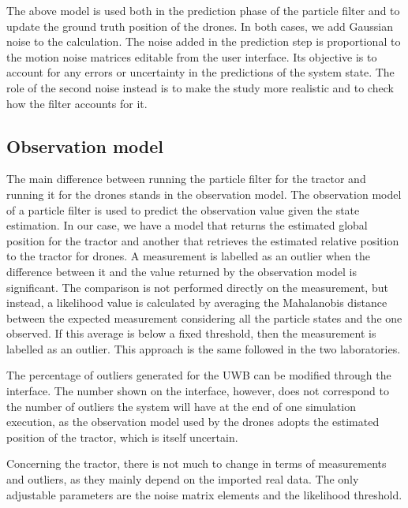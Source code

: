 \documentclass[letterpaper,twocolumn,10pt]{article}
\begin{document}
The above model is used both in the prediction phase of the particle filter and to update the ground truth position of the drones. In both cases, we add Gaussian noise to the calculation.
The noise added in the prediction step is proportional to the motion noise matrices editable from the user interface. Its objective is to account for any errors or uncertainty in the predictions of the system state.  
The role of the second noise instead is to make the study more realistic and to check how the filter accounts for it.

\subsection*{Observation model}
The main difference between running the particle filter for the tractor and running it for the drones stands in the observation model.
The observation model of a particle filter is used to predict the observation value given the state estimation. In our case,  we have a model that returns the estimated global position for the tractor and another that retrieves the estimated relative position to the tractor for drones. A measurement is labelled as an outlier when the difference between it and the value returned by the observation model is significant. The comparison is not performed directly on the measurement, but instead, a likelihood value is calculated by averaging the Mahalanobis distance between the expected measurement considering all the particle states and the one observed. If this average is below a fixed threshold, then the measurement is labelled as an outlier. This approach is the same followed in the two laboratories.

The percentage of outliers generated for the UWB can be modified through the interface. The number shown on the interface, however, does not correspond to the number of outliers the system will have at the end of one simulation execution, as the observation model used by the drones adopts the estimated position of the tractor, which is itself uncertain. 

Concerning the tractor, there is not much to change in terms of measurements and outliers, as they mainly depend on the imported real data. The only adjustable parameters are the noise matrix elements and the likelihood threshold.
\end{document}
